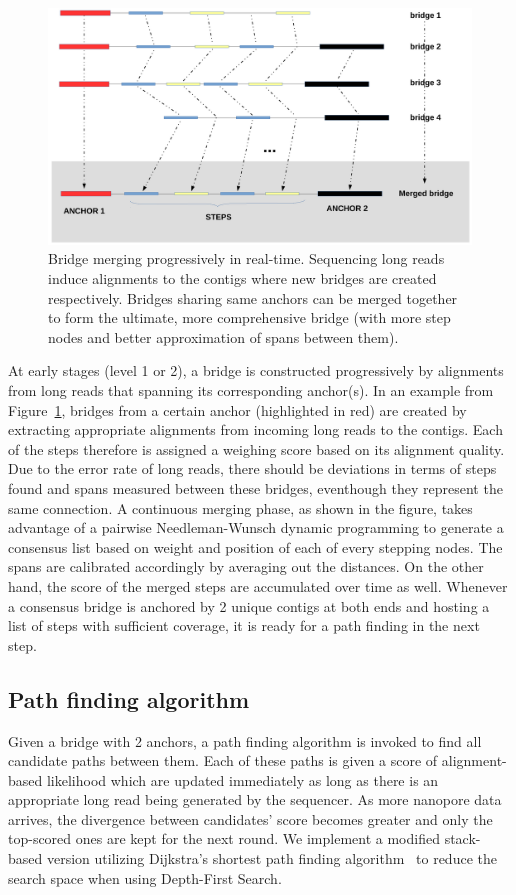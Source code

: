 \documentclass[10pt,twocolumn,twoside]{genpaper}
\begin{document}
\begin{figure}[!hpt]
\centering
\includegraphics[width=.8\textwidth]{images/bridge_merging.pdf}
\caption[Example of bridge merging progressively]{Bridge merging progressively in real-time. Sequencing long reads induce alignments to the contigs where new bridges are created respectively. Bridges sharing same anchors can be merged together to form the ultimate, more comprehensive bridge (with more step nodes and better approximation of spans between them).}
\label{figure:npgraph_merging}
\end{figure}

At early stages (level 1 or 2), a bridge is constructed progressively by alignments from long reads that spanning its corresponding anchor(s).
In an example from Figure~\ref{figure:npgraph_merging}, bridges from a certain anchor (highlighted in red) are created by extracting appropriate alignments from incoming long reads to the contigs. Each of the steps therefore is assigned a weighing score based on its alignment quality.
Due to the error rate of long reads, there should be deviations in terms of steps found and spans measured between these bridges, eventhough they represent the same connection.
A continuous merging phase, as shown in the figure, takes advantage of a pairwise Needleman-Wunsch dynamic programming to generate a consensus list based on weight and position of each of every stepping nodes. The spans are calibrated accordingly by averaging out the distances. On the other hand, the score of the merged steps are accumulated over time as well.
Whenever a consensus bridge is anchored by 2 unique contigs at both ends and hosting a list of steps with sufficient coverage, it is ready for a path finding in the next step.


\subsection*{Path finding algorithm}
Given a bridge with 2 anchors, a path finding algorithm is invoked to find all candidate paths between them. Each of these paths is given a score of alignment-based likelihood which are updated immediately as long as there is an appropriate long read being generated by the sequencer. As more nanopore data arrives, the divergence between candidates' score becomes greater and only the top-scored ones are kept for the next round.
We implement a modified stack-based version utilizing Dijkstra's shortest path finding algorithm~\cite{Dijkstra1959} to reduce the search space when using Depth-First Search.
\end{document}
